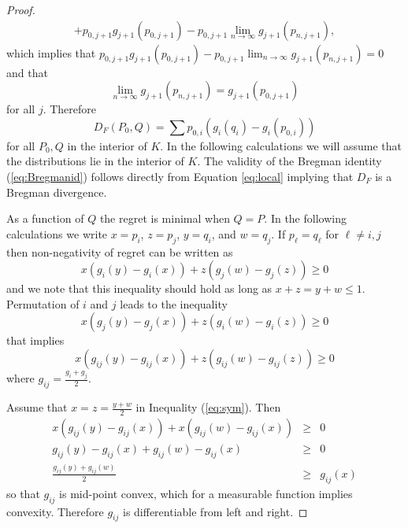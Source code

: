 \documentclass[10pt,a4paper,draft]{article}
\begin{document}
\begin{proof}
\begin{multline*}
+p_{0,j+1}g_{j+1}\left(p_{0,j+1}\right)-p_{0,j+1}\lim_{n\to\infty}g_{j+1}\left(p_{n,j+1}\right),
\end{multline*}
which implies that
$p_{0,j+1}g_{j+1}\left(p_{0,j+1}\right)-p_{0,j+1}\lim_{n\to\infty}g_{j+1}\left(p_{n,j+1}\right)=0$
and that 
\[
\lim_{n\to\infty}g_{j+1}\left(p_{n,j+1}\right)=g_{j+1}\left(p_{0,j+1}\right)
\]
for all $j$. Therefore
\begin{equation}\label{eq:local}
D_{F}\left(P_{0},Q\right)=\sum
p_{0,i}\left(g_{i}\left(q_{i}\right)-g_{i}\left(p_{0,i}\right)\right)
\end{equation}
for all $P_{0},Q$ in the interior of $K$. In the following calculations we will assume that the distributions lie in the interior of $K$. The validity of the Bregman identity (\ref{eq:Bregmanid}) follows directly from Equation \ref{eq:local} implying that $D_F$ is a Bregman divergence.

As a function of $Q$ the regret is minimal when $Q=P.$ In the
following calculations we write $x=p_i$, $z=p_j$, $y=q_i$, and
$w=q_j$. If
$p_{\ell}=q_{\ell}$ for $\ell \neq i,j$ then non-negativity of
regret can be written as
\[
x\left(g_{i}\left(y\right)-g_{i}\left(x\right)\right)+z\left(g_{j}\left(w\right)-g_{j}\left(z\right)\right)\geq0
\]
and we note that this inequality should hold as long as
$x+z=y+w\leq 1.$ Permutation of $i$ and $j$ leads to the
inequality
\[
x\left(g_{j}\left(y\right)-g_{j}\left(x\right)\right)+z\left(g_{i}\left(w\right)-g_{i}\left(z\right)\right)\geq0
\]
that implies
\begin{equation}
x\left(g_{ij}\left(y\right)-g_{ij}\left(x\right)\right)+z\left(g_{ij}\left(w\right)-g_{ij}\left(z\right)\right)\geq0 \label{eq:sym}
\end{equation}
where $g_{ij}=\frac{g_{i}+g_{j}}{2}.$ 

Assume that $x=z=\frac{y+w}{2}$ in Inequality (\ref{eq:sym}). Then
\begin{eqnarray*}
x\left(g_{ij}\left(y\right)-g_{ij}\left(x\right)\right)+x\left(g_{ij}\left(w\right)-g_{ij}\left(x\right)\right)
& \geq & 0\\
g_{ij}\left(y\right)-g_{ij}\left(x\right)+g_{ij}\left(w\right)-g_{ij}\left(x\right)
& \geq & 0\\
\frac{g_{ij}\left(y\right)+g_{ij}\left(w\right)}{2} & \geq &
g_{ij}\left(x\right)
\end{eqnarray*}
so that $g_{ij}$ is mid-point convex, which for a measurable
function implies convexity. Therefore $g_{ij}$ is differentiable from
left and right. 


\end{proof}
\end{document}
